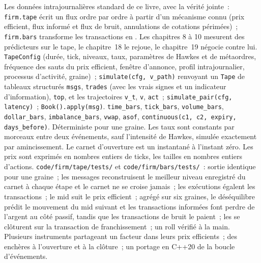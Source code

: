 \begin{build}
 Les données intrajournalières standard de ce livre, avec la vérité jointe~: \texttt{firm.tape} écrit un flux ordre par ordre
à partir d'un mécanisme connu (prix efficient, flux informé et flux de bruit, annulations de cotations périmées)~; \texttt{firm.bars} transforme les transactions
en . Les chapitres 8 à 10 mesurent des prédicteurs sur le tape, le chapitre~18 le rejoue, le chapitre~19 négocie contre lui.
 \texttt{TapeConfig} (durée, tick, niveaux, taux, paramètres de Hawkes et de métaordres, fréquence des sauts
du prix efficient, fenêtre d'annonce, profil intrajournalier, processus d'activité, graine)~; \texttt{simulate(cfg, v\_path)} renvoyant un \texttt{Tape} de
tableaux structurés \texttt{msgs}, \texttt{trades} (avec les vrais signes et un indicateur d'information), \texttt{top}, et les trajectoires \texttt{v\_t},
\texttt{v}, \texttt{act}~; \texttt{simulate\_pair(cfg, latency)}~; \texttt{Book().apply(msg)}. \texttt{time\_bars},
\texttt{tick\_bars}, \texttt{volume\_bars}, \texttt{dollar\_bars}, \texttt{imbalance\_bars}, \texttt{vwap}, \texttt{asof},
\texttt{continuous(c1, c2, expiry, days\_before)}.
 Déterministe pour une graine. Les taux sont constants par morceaux entre deux événements, sauf l'intensité de Hawkes, simulée exactement
par amincissement. Le carnet d'ouverture est un instantané à l'instant zéro. Les prix sont exprimés en nombres entiers de ticks, les tailles en nombres entiers d'actions.
 \texttt{code/firm/tape/tests/} et \texttt{code/firm/bars/tests/}~: sortie identique pour une graine~;
les messages reconstruisent le meilleur niveau enregistré du carnet à chaque étape et le carnet ne se croise jamais~; les exécutions égalent les transactions~; le mid suit
le prix efficient~; agrégé sur six graines, le déséquilibre prédit le mouvement du mid suivant et les transactions informées font perdre de l'argent au
côté passif, tandis que les transactions de bruit le paient~; les  se clôturent sur la transaction de franchissement~; un roll vérifié à la main.
 Plusieurs instruments partageant un facteur dans leurs prix efficients~; des enchères à l'ouverture et à la clôture~; un portage en C++20
de la boucle d'événements.
\end{build}

